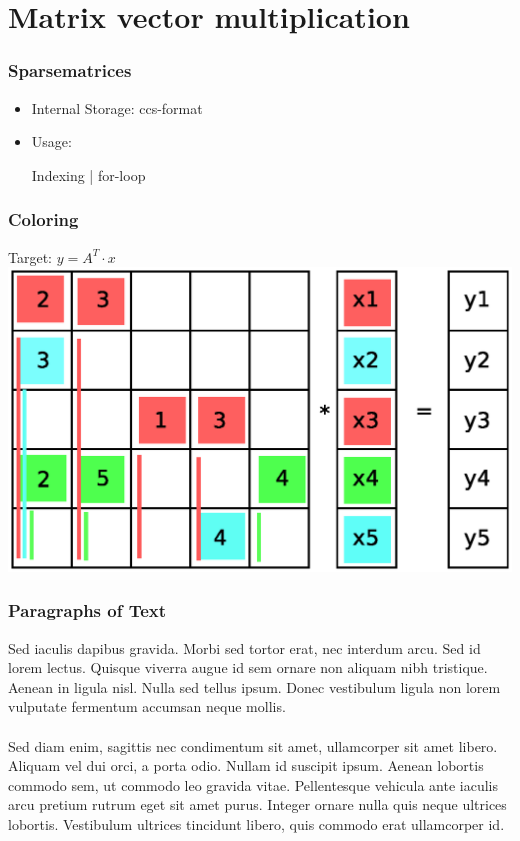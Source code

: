 \documentclass{beamer}
\begin{document}
\section{Matrix vector multiplication}


\begin{frame}
\frametitle{Sparsematrices}
\begin{itemize}
\item Internal Storage: ccs-format
\item Usage:
\begin{block}{Indexing | for-loop}
\codeA
\end{block}
\end{itemize}
\end{frame}

\begin{frame}
\frametitle{Coloring}
Target: $y=A^T \cdot x$
\includegraphics[width=0.8\linewidth]{graphic/coloringT.eps}
\end{frame}





\begin{frame}
\frametitle{Paragraphs of Text}
Sed iaculis dapibus gravida. Morbi sed tortor erat, nec interdum arcu. Sed id lorem lectus. Quisque viverra augue id sem ornare non aliquam nibh tristique. Aenean in ligula nisl. Nulla sed tellus ipsum. Donec vestibulum ligula non lorem vulputate fermentum accumsan neque mollis.\\~\\

Sed diam enim, sagittis nec condimentum sit amet, ullamcorper sit amet libero. Aliquam vel dui orci, a porta odio. Nullam id suscipit ipsum. Aenean lobortis commodo sem, ut commodo leo gravida vitae. Pellentesque vehicula ante iaculis arcu pretium rutrum eget sit amet purus. Integer ornare nulla quis neque ultrices lobortis. Vestibulum ultrices tincidunt libero, quis commodo erat ullamcorper id.
\end{frame}
\end{document}
